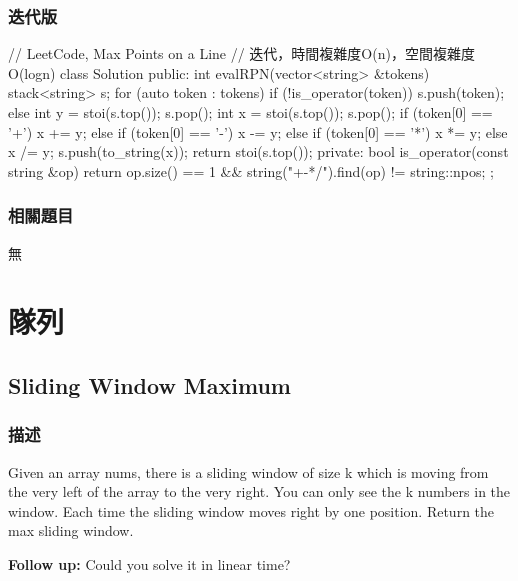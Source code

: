 \subsubsection{迭代版}
\begin{Code}
// LeetCode, Max Points on a Line
// 迭代，時間複雜度O(n)，空間複雜度O(logn)
class Solution {
public:
    int evalRPN(vector<string> &tokens) {
        stack<string> s;
        for (auto token : tokens) {
            if (!is_operator(token)) {
                s.push(token);
            } else {
                int y = stoi(s.top());
                s.pop();
                int x = stoi(s.top());
                s.pop();
                if (token[0] == '+')       x += y;
                else if (token[0] == '-')  x -= y;
                else if (token[0] == '*')  x *= y;
                else                       x /= y;
                s.push(to_string(x));
            }
        }
        return stoi(s.top());
    }
private:
    bool is_operator(const string &op) {
        return op.size() == 1 && string("+-*/").find(op) != string::npos;
    }
};
\end{Code}


\subsubsection{相關題目}
\begindot
\item 無
\myenddot


\section{隊列} %

\subsection{Sliding Window Maximum} %
\label{sec:sliding-window-maximum}


\subsubsection{描述}
Given an array nums, there is a sliding window of size k which is moving from the very left of the array to the very right. You can only see the k numbers in the window. Each time the sliding window moves right by one position. Return the max sliding window.


\textbf{Follow up:}
Could you solve it in linear time?

